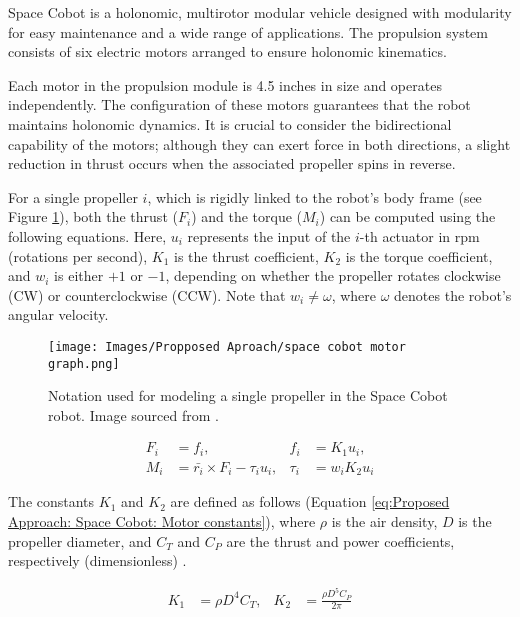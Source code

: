 Space Cobot \cite{RoqueVentura2016spacecobot} is a holonomic, multirotor modular vehicle designed with modularity for easy maintenance and a wide range of applications. The propulsion system consists of six electric motors arranged to ensure holonomic kinematics.

Each motor in the propulsion module is 4.5 inches in size and operates independently. The configuration of these motors guarantees that the robot maintains holonomic dynamics. It is crucial to consider the bidirectional capability of the motors; although they can exert force in both directions, a slight reduction in thrust occurs when the associated propeller spins in reverse.

For a single propeller \(i\), which is rigidly linked to the robot's body frame (see Figure \ref{fig:Proposed Approach: Space Cobot: Motor graph}), both the thrust (\(F_{i}\)) and the torque (\(M_{i}\)) can be computed using the following equations. Here, \(u_i\) represents the input of the \(i\)-th actuator in rpm (rotations per second), \(K_1\) is the thrust coefficient, \(K_2\) is the torque coefficient, and \(w_i\) is either \(+1\) or \(-1\), depending on whether the propeller rotates clockwise (CW) or counterclockwise (CCW). Note that \(w_i \neq \omega\), where \(\omega\) denotes the robot's angular velocity.

\begin{figure}[H]
    \centering
    \texttt{[image: Images/Propposed Aproach/space cobot motor graph.png]}
    \caption{Notation used for modeling a single propeller in the Space Cobot robot. Image sourced from \cite{RoqueVentura2016spacecobot}.}
    \label{fig:Proposed Approach: Space Cobot: Motor graph}
\end{figure}

\begin{align}
    F_{i} &= f_i, & f_i &= K_{1} u_i, \\
    M_{i} &= \bar{r_{i}} \times F_{i} - \tau_{i} u_i, & \tau_{i} &= w_i K_{2} u_i
    \label{eq:Proposed Approach: Space Cobot: Motor equations}
\end{align}

The constants \(K_1\) and \(K_2\) are defined as follows (Equation \ref{eq:Proposed Approach: Space Cobot: Motor constants}), where \(\rho\) is the air density, \(D\) is the propeller diameter, and \(C_T\) and \(C_P\) are the thrust and power coefficients, respectively (dimensionless) \cite{mccormick1994aerodynamics}.

\begin{align}
    K_{1} &= \rho D^{4} C_{T}, & K_{2} &= \frac{\rho D^{5} C_{P}}{2\pi}
    \label{eq:Proposed Approach: Space Cobot: Motor constants}
\end{align}

